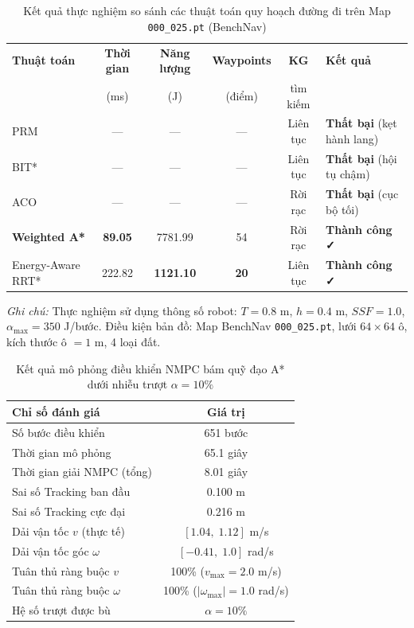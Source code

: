 \begin{table}[htbp]
\centering
\caption{Kết quả thực nghiệm so sánh các thuật toán quy hoạch đường đi trên Map \texttt{000\_025.pt} (BenchNav)}
\label{tab:algo_compare}
\begin{tabular}{lccccl}
    \toprule
    \textbf{Thuật toán} & \textbf{Thời gian} & \textbf{Năng lượng} & \textbf{Waypoints} & \textbf{KG} & \textbf{Kết quả} \\
                        & (ms)               & (J)                  & (điểm)             & tìm kiếm    & \\
    \midrule
    PRM              & ---    & ---      & ---  & Liên tục & \textbf{Thất bại} (kẹt hành lang) \\
    BIT*             & ---    & ---      & ---  & Liên tục & \textbf{Thất bại} (hội tụ chậm) \\
    ACO              & ---    & ---      & ---  & Rời rạc  & \textbf{Thất bại} (cục bộ tối) \\
    \textbf{Weighted A*}  & \textbf{89.05}  & 7781.99  & 54   & Rời rạc  & \textbf{Thành công ✓} \\
    Energy-Aware RRT* & 222.82 & \textbf{1121.10} & \textbf{20}  & Liên tục & \textbf{Thành công ✓} \\
    \bottomrule
\end{tabular}
\vspace{0.3em}
\begin{minipage}{0.9\textwidth}
\small \textit{Ghi chú:} Thực nghiệm sử dụng thông số robot: $T=0.8$ m, $h=0.4$ m, $SSF=1.0$, $\alpha_{\max}=350$ J/bước.
Điều kiện bản đồ: Map BenchNav \texttt{000\_025.pt}, lưới $64\times64$ ô, kích thước ô $= 1$ m, 4 loại đất.
\end{minipage}
\end{table}

\begin{table}[htbp]
\centering
\caption{Kết quả mô phỏng điều khiển NMPC bám quỹ đạo A* dưới nhiễu trượt $\alpha = 10\%$}
\label{tab:nmpc_results}
\begin{tabular}{lc}
    \toprule
    \textbf{Chỉ số đánh giá} & \textbf{Giá trị} \\
    \midrule
    Số bước điều khiển          & 651 bước \\
    Thời gian mô phỏng          & 65.1 giây \\
    Thời gian giải NMPC (tổng)  & 8.01 giây \\
    Sai số Tracking ban đầu     & 0.100 m \\
    Sai số Tracking cực đại     & 0.216 m \\
    Dải vận tốc $v$ (thực tế)   & $[1.04,\; 1.12]$ m/s \\
    Dải vận tốc góc $\omega$    & $[-0.41,\; 1.0]$ rad/s \\
    Tuân thủ ràng buộc $v$      & 100\% ($v_{\max} = 2.0$ m/s) \\
    Tuân thủ ràng buộc $\omega$ & 100\% ($|\omega_{\max}| = 1.0$ rad/s) \\
    Hệ số trượt được bù          & $\alpha = 10\%$ \\
    \bottomrule
\end{tabular}
\end{table}
